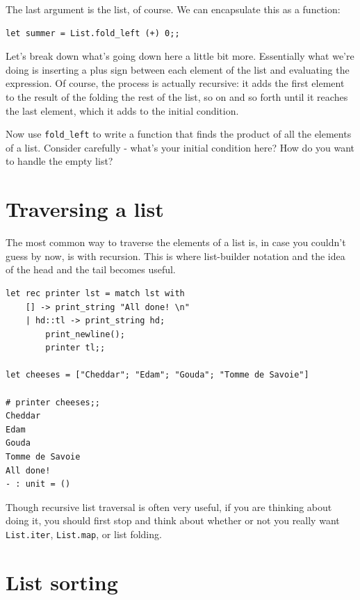 \documentclass[10pt]{book}
\begin{document}
The last argument is the list, of course. We can encapsulate this as a function:

\beforeverb
\begin{verbatim}
let summer = List.fold_left (+) 0;;
\end{verbatim}
\afterverb

Let's break down what's going down here a little bit more. Essentially what we're 
doing is inserting a plus sign between each element of the list and evaluating the 
expression. Of course, the process is actually recursive: it adds the first element 
to the result of the folding the rest of the list, so on and so forth until it reaches 
the last element, which it adds to the initial condition.

\begin{ex}
Now use {\tt \verb"fold_left"} to write a function that finds the product of 
all the elements of a list. Consider carefully - what's your initial 
condition here? How do you want to handle the empty list?
\end{ex}

\section{Traversing a list}
The most common way to traverse the elements of a list is, 
in case you couldn't guess by now, is with recursion.  This 
is where list-builder notation and the idea of the head and 
the tail becomes useful.

\beforeverb
\begin{verbatim}
let rec printer lst = match lst with
	[] -> print_string "All done! \n"
	| hd::tl -> print_string hd;
		print_newline();
		printer tl;;

let cheeses = ["Cheddar"; "Edam"; "Gouda"; "Tomme de Savoie"]

# printer cheeses;;
Cheddar
Edam
Gouda
Tomme de Savoie
All done!
- : unit = ()

\end{verbatim}
\afterverb
%

Though recursive list traversal is often very useful, if you
are thinking about doing it, you should first stop and think 
about whether or not you really want {\tt List.iter}, {\tt List.map},
or list folding.


\section{List sorting}
\end{document}
